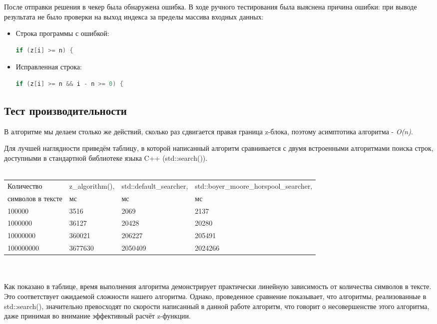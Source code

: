 \documentclass[12pt]{article}
\begin{document}
После отправки решения в чекер была обнаружена ошибка. В ходе ручного тестирования была выяснена причина ошибки: при выводе результата не было проверки на выход индекса за пределы массива входных данных:
\begin{itemize}
\item
    Строка программы с ошибкой:
    \begin{lstlisting}[language=C++]
            if (z[i] >= n) {
    \end{lstlisting}
\item
    Исправленная строка:
    \begin{lstlisting}[language=C++]
            if (z[i] >= n && i - n >= 0) {
    \end{lstlisting}
\end{itemize}

\subsection*{Тест производительности}
В алгоритме мы делаем столько же действий, сколько раз сдвигается правая граница z-блока, поэтому асимптотика алгоритма - \textit{O(n)}.

Для лучшей наглядности приведём таблицу, в которой написанный алгоритм сравнивается с двумя встроенными алгоритмами поиска строк, доступными в стандартной библиотеке языка C++ (std::search()).
\\
\\
\begin{tabularx}{\textwidth}{ |X|X|X|X| }
    \hline
    Количество & z\_algorithm(), & std::default\_searcher, & std::boyer\_moore\_horspool\_searcher, \\
    символов в тексте  & мс & мс & мс \\
    \hline
    100000 & 3516 & 2069 & 2137 \\
    1000000 & 36127 & 20428 & 20280 \\
    10000000 & 360021 & 206227 & 205491 \\
    100000000 & 3677630 & 2050409 & 2024266 \\
    \hline
\end{tabularx}
\\
\\
Как показано в таблице, время выполнения алгоритма демонстрирует практически линейную зависимость от количества символов в тексте. Это соответствует ожидаемой сложности нашего алгоритма. Однако, проведенное сравнение показывает, что алгоритмы, реализованные в std::search(), значительно превосходят по скорости написанный в данной работе алгоритм, что говорит о несовершенстве этого алгоритма, даже принимая во внимание эффективный расчёт z-функции.
\end{document}
